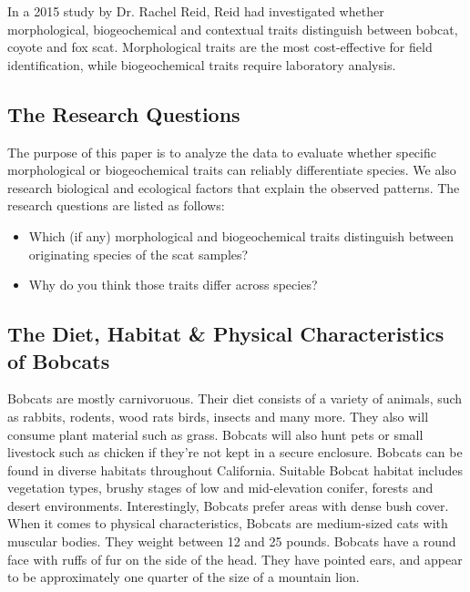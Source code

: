 \documentclass[a4paper]{article}
\begin{document}
\noindent In a 2015 study by Dr. Rachel Reid, Reid had investigated whether morphological, biogeochemical and contextual traits distinguish between bobcat, coyote and
fox scat. Morphological traits are the most cost-effective for field identification, while biogeochemical traits require laboratory analysis. 

\subsection{The Research Questions}
The purpose of this paper is to analyze the data to evaluate whether specific morphological or biogeochemical traits can reliably differentiate species. We 
also research biological and ecological factors that explain the observed patterns. The research questions are listed as follows:
\begin{itemize}
    \item Which (if any) morphological and biogeochemical traits distinguish between originating species of the scat samples?
    \item Why do you think those traits differ across species?
\end{itemize}

\subsection{The Diet, Habitat \& Physical Characteristics of Bobcats}
Bobcats are mostly carnivoruous. Their diet consists of a variety of animals, such as rabbits, rodents, wood rats birds, insects and many more. They also
will consume plant material such as grass. Bobcats will also hunt pets or small livestock such as chicken if they're not kept in a secure enclosure. Bobcats
can be found in diverse habitats throughout California. Suitable Bobcat habitat includes vegetation types, brushy stages of low and mid-elevation conifer, 
forests and desert environments. Interestingly, Bobcats prefer areas with dense bush cover. When it comes to physical characteristics, Bobcats are 
medium-sized cats with muscular bodies. They weight between 12 and 25 pounds. Bobcats have a round face with ruffs of fur on the side of the head. They have
pointed ears, and appear to be approximately one quarter of the size of a mountain lion.
\end{document}
